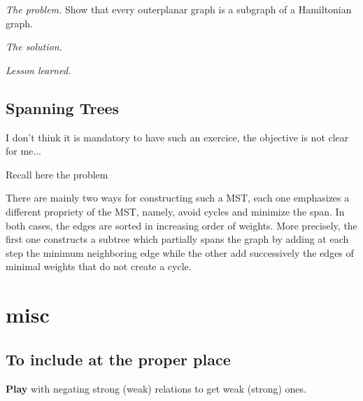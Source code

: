 \medskip

\noindent \textit{The problem.}
Show that every outerplanar graph is a subgraph of a Hamiltonian graph.
\medskip

\noindent \textit{The solution.}

\medskip

\noindent \textit{Lesson learned.}



\subsection{Spanning Trees}
\label{Exercice:spanningTrees}

{\Denis I don't think it is mandatory to have such an exercice, the objective is not clear for me...}

Recall here the problem
\medskip

There are mainly two ways for constructing such a MST, each one
emphasizes a different propriety of the MST, namely, avoid cycles and
minimize the span.  In both cases, the edges are sorted in increasing
order of weights.  More precisely, the first one constructs a subtree
which partially spans the graph by adding at each step the minimum
neighboring edge while the other add successively the edges of minimal
weights that do not create a cycle.







\section{misc}

%
%
%
%



\subsection{To include at the proper place}

\textbf{ Play} with negating strong (weak) relations to get weak (strong) ones.

